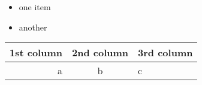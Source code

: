 \begin{itemize}
    \item one item
    \item another
\end{itemize}

\begin{tabular}{r|cl}
    1st column & 2nd column & 3rd column\\
    \hline
    a & b & c
\end{tabular}



